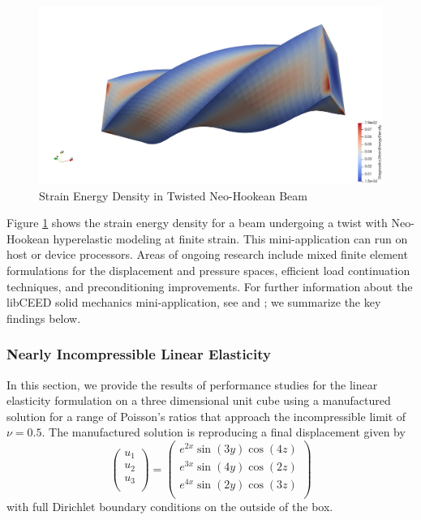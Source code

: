 \begin{figure}[ht!]
\includegraphics[width=.99\linewidth]{../img/SolidTwistExample}
\caption{Strain Energy Density in Twisted Neo-Hookean Beam}
\label{fig:solidtwist}
\end{figure}

Figure \ref{fig:solidtwist} shows the strain energy density for a beam undergoing a twist with Neo-Hookean hyperelastic modeling at finite strain.
This mini-application can run on host or device processors.
Areas of ongoing research include mixed finite element formulations for the displacement and pressure spaces, efficient load continuation techniques, and preconditioning improvements.
For further information about the libCEED solid mechanics mini-application, see \cite{imece2020} and \cite{mehraban2021simulating}; we summarize the key findings below.

\subsubsection{Nearly Incompressible Linear Elasticity}

In this section, we provide the results of performance studies for the linear elasticity formulation on a three dimensional unit cube using a manufactured solution for a range of Poisson's ratios that approach the incompressible limit of $\nu = 0.5$.
The manufactured solution is reproducing a final displacement given by
\begin{equation}
\begin{pmatrix}
u_1 \\
u_2 \\
u_3 \\
\end{pmatrix} =
\begin{pmatrix}
e^{2 x} \sin \left( 3 y \right) \cos \left( 4 z \right) \\
e^{3 x} \sin \left( 4 y \right) \cos \left( 2 z \right) \\
e^{4 x} \sin \left( 2 y \right) \cos \left( 3 z \right) \\
\end{pmatrix}
\end{equation}
with full Dirichlet boundary conditions on the outside of the box.

